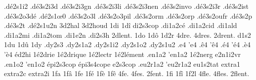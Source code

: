 {                    .d\'e2s1i2
                    .d\'e3s2i3d
                    .d\'e3s2i3gn
                    .d\'e3s2i3li
                    .d\'e3s2i3nen
                    .d\'e3s2invo
                    .d\'e3s2i3r
                    .d\'e3s2ist
                    .d\'e3s2o3d\'e
                    .d\'e2s1\oe0 %
                    .d\'e3s2o3l
                    .d\'e3s2o3pil
                    .d\'e3s2orm
                    .d\'e3s2orp
                    .d\'e3s2oufr
                    .d\'e3s2p %
                    .d\'e3s2t %
                    .d\'e2s1u2n
                    3d2hal
                    3d2houd
1di
1d\^i
                    di2s3cop
                    .di1a2c\'e
                    .di1a2cid
                    .di1ald
                    .di1a2mi
                    .di1a2tom
                    .di1e2n
                    .di2s3h
2dlent. %
1do
1d\^o
1d2r
4dre.
4dres.
2drent. %
d1s2
1du
1d\^u
1dy
                    .dy2s3
                    .dy2s1a2
                    .dy2s1i2
                    .dy2s1o2 %
                    .dy2s1u2
.e4
'e4
.\^e4
'\^e4
.\'e4
'\'e4
.\`e4
'\`e4
\'ed2hi %
                    1\'e2drie
                    1\'e2drique
                    1\'e2lectr
                    1\'e2l\'ement
                    .en1a2
                    'en1a2
                    1\'e2nerg
                    e2n1i2vr
                    .en1o2
                    'en1o2
                    \'epi2s3cop
                    \'epi3s4cope
                    e2s3cop
                    .eu2r1a2
                    'eu2r1a2
                    eu1s2tat
                    extra1
                    extra2c
                    extra2i
1fa
1f\^a
1fe
1f\'e
1f\`e
1f\^e
4fe.
4fes.
2fent. %
%
1fi
1f\^i
1f2l
4fle.
4fles.
2flent. %
}
